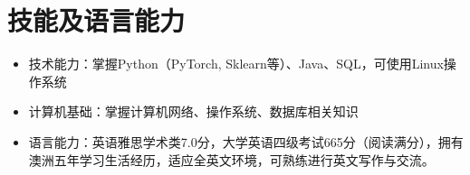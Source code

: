 \documentclass[UTF8,letterpaper,11pt]{article}
\begin{document}

\section{\textbf{技能及语言能力}}

\begin{itemize}
  \setlength\itemsep{1.8pt}
  \item 技术能力：掌握Python（PyTorch, Sklearn等）、Java、SQL，可使用Linux操作系统
  \item 计算机基础：掌握计算机网络、操作系统、数据库相关知识
  \item 语言能力：英语雅思学术类7.0分，大学英语四级考试665分（阅读满分），拥有澳洲五年学习生活经历，适应全英文环境，可熟练进行英文写作与交流。
\end{itemize}


\end{document}
